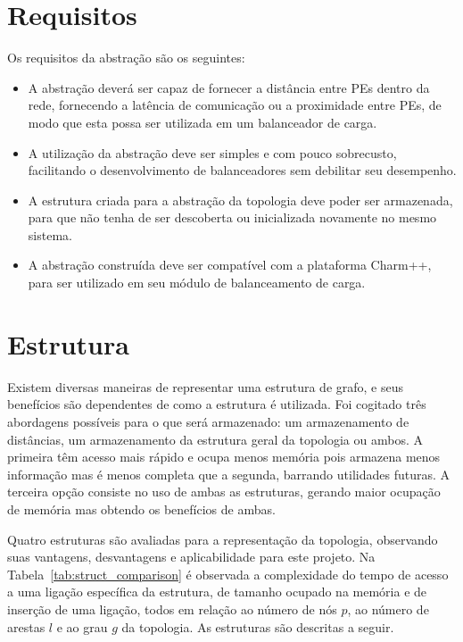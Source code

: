 \documentclass[
	12pt,				%
	openright,			%
	twoside,			%
	a4paper,			%
	english,			%
	brazil,				%
	]{abntex2}
\newcommand{\charm}{{{Charm++}}\xspace}
\begin{document}
\section{Requisitos}
\label{sec:requisitos}

Os requisitos da abstração são os seguintes:

\begin{itemize}
    \item A abstração deverá ser capaz de fornecer a distância entre PEs dentro da rede, fornecendo a latência de comunicação ou a proximidade entre PEs, de modo que esta possa ser utilizada em um balanceador de carga.
    \item A utilização da abstração deve ser simples e com pouco sobrecusto, facilitando o desenvolvimento de balanceadores sem debilitar seu desempenho.
    \item A estrutura criada para a abstração da topologia deve poder ser armazenada, para que não tenha de ser descoberta ou inicializada novamente no mesmo sistema.
    \item A abstração construída deve ser compatível com a plataforma \charm, para ser utilizado em seu módulo de balanceamento de carga.
\end{itemize}

\section{Estrutura}
\label{sec:estruturas}

Existem diversas maneiras de representar uma estrutura de grafo, e seus benefícios são dependentes de como a estrutura é utilizada.
Foi cogitado três abordagens possíveis para o que será armazenado: um armazenamento de distâncias, um armazenamento da estrutura geral da topologia ou ambos.
A primeira têm acesso mais rápido e ocupa menos memória pois armazena menos informação mas é menos completa que a segunda, barrando utilidades futuras.
A terceira opção consiste no uso de ambas as estruturas, gerando maior ocupação de memória mas obtendo os benefícios de ambas. 

Quatro estruturas são avaliadas para a representação da topologia, observando suas vantagens, desvantagens e aplicabilidade para este projeto.
Na Tabela~\ref{tab:struct_comparison} é observada a complexidade do tempo de acesso a uma ligação específica da estrutura, de tamanho ocupado na memória e de inserção de uma ligação, todos em relação ao número de nós $p$, ao número de arestas $l$ e ao grau $g$ da topologia. As estruturas são descritas a seguir.
\end{document}
